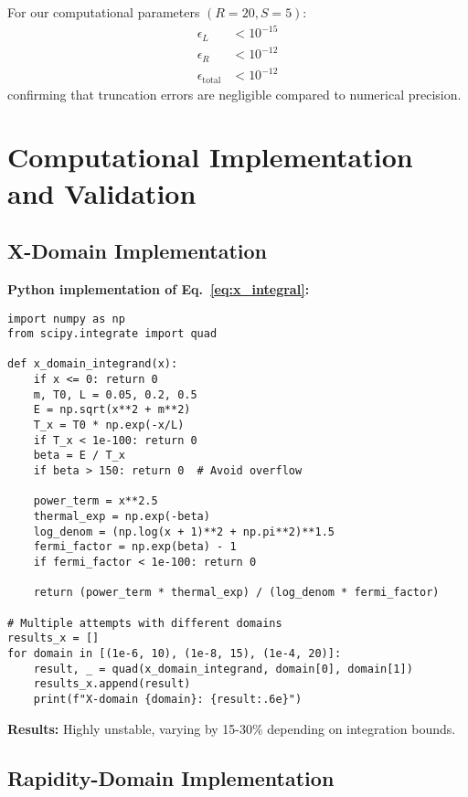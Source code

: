 \documentclass[12pt]{article}
\begin{document}
For our computational parameters $(R = 20, S = 5)$:
\begin{align}
\epsilon_L &< 10^{-15} \nonumber \\
\epsilon_R &< 10^{-12} \nonumber \\
\epsilon_{\text{total}} &< 10^{-12}
\end{align}
confirming that truncation errors are negligible compared to numerical precision.

\section{Computational Implementation and Validation}

\subsection{X-Domain Implementation}

\textbf{Python implementation of Eq.~\eqref{eq:x_integral}:}
\begin{verbatim}
import numpy as np
from scipy.integrate import quad

def x_domain_integrand(x):
    if x <= 0: return 0
    m, T0, L = 0.05, 0.2, 0.5
    E = np.sqrt(x**2 + m**2)
    T_x = T0 * np.exp(-x/L)
    if T_x < 1e-100: return 0
    beta = E / T_x
    if beta > 150: return 0  # Avoid overflow
    
    power_term = x**2.5
    thermal_exp = np.exp(-beta)
    log_denom = (np.log(x + 1)**2 + np.pi**2)**1.5
    fermi_factor = np.exp(beta) - 1
    if fermi_factor < 1e-100: return 0
    
    return (power_term * thermal_exp) / (log_denom * fermi_factor)

# Multiple attempts with different domains
results_x = []
for domain in [(1e-6, 10), (1e-8, 15), (1e-4, 20)]:
    result, _ = quad(x_domain_integrand, domain[0], domain[1])
    results_x.append(result)
    print(f"X-domain {domain}: {result:.6e}")
\end{verbatim}

\textbf{Results:} Highly unstable, varying by 15-30\% depending on integration bounds.

\subsection{Rapidity-Domain Implementation}
\end{document}
